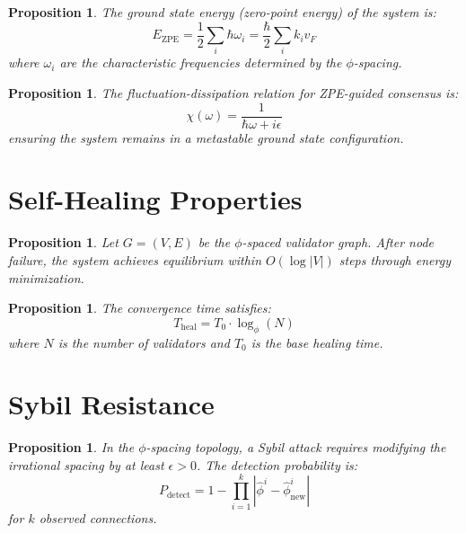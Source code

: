 \documentclass[12pt]{article}
\newtheorem lemma}[theorem]{Lemma}
\newtheorem{prop}[theorem]{Proposition}
\begin{document}
\begin{prop}
The ground state energy (zero-point energy) of the system is:
\begin{equation}
E_{\text{ZPE}} = \frac{1}{2}\sum_{i} \hbar\omega_i = \frac{\hbar}{2}\sum_{i} k_i v_F
\label{eq:zpe}
\end{equation}
where $\omega_i$ are the characteristic frequencies determined by the $\phi$-spacing.
\end{prop}

\begin{prop}
The fluctuation-dissipation relation for ZPE-guided consensus is:
\begin{equation}
\chi(\omega) = \frac{1}{\hbar\omega + i\epsilon}
\label{eq:fluctuation}
\end{equation}
ensuring the system remains in a metastable ground state configuration.
\end{prop}

\section{Self-Healing Properties}

\begin{prop}
Let $G = (V, E)$ be the $\phi$-spaced validator graph. After node failure, the system achieves equilibrium within $O(\log |V|)$ steps through energy minimization.
\end{prop}

\begin{prop}
The convergence time satisfies:
\begin{equation}
T_{\text{heal}} = T_0 \cdot \log_{\phi}(N)
\label{eq:heal_time}
\end{equation}
where $N$ is the number of validators and $T_0$ is the base healing time.
\end{prop}

\section{Sybil Resistance}

\begin{prop}
In the $\phi$-spacing topology, a Sybil attack requires modifying the irrational spacing by at least $\epsilon > 0$. The detection probability is:
\begin{equation}
P_{\text{detect}} = 1 - \prod_{i=1}^{k} \left|\hat{\phi}^i - \hat{\phi}_{\text{new}}^i\right|
\label{eq:sybil_detect}
\end{equation}
for $k$ observed connections.
\end{prop}
\end{document}
